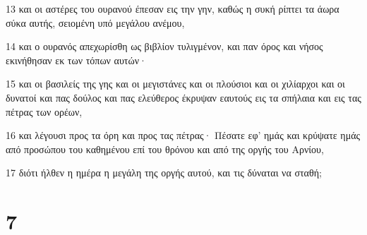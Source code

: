 \par 13 και οι αστέρες του ουρανού έπεσαν εις την γην, καθώς η συκή ρίπτει τα άωρα σύκα αυτής, σειομένη υπό μεγάλου ανέμου,
\par 14 και ο ουρανός απεχωρίσθη ως βιβλίον τυλιγμένον, και παν όρος και νήσος εκινήθησαν εκ των τόπων αυτών·
\par 15 και οι βασιλείς της γης και οι μεγιστάνες και οι πλούσιοι και οι χιλίαρχοι και οι δυνατοί και πας δούλος και πας ελεύθερος έκρυψαν εαυτούς εις τα σπήλαια και εις τας πέτρας των ορέων,
\par 16 και λέγουσι προς τα όρη και προς τας πέτρας· Πέσατε εφ' ημάς και κρύψατε ημάς από προσώπου του καθημένου επί του θρόνου και από της οργής του Αρνίου,
\par 17 διότι ήλθεν η ημέρα η μεγάλη της οργής αυτού, και τις δύναται να σταθή;

\chapter{7}

